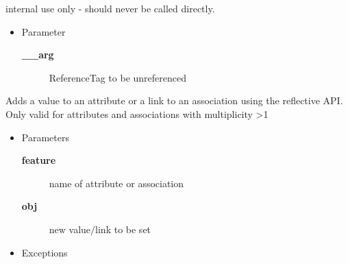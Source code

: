 \begin{desc}internal use only - should never be called directly.
\begin{itemize}
\item{Parameter
  \begin{description}
   \item[{\bf \_\_arg}]{ReferenceTag to be unreferenced}
  \end{description}}
\end{itemize}
\end{desc}

\begin{desc}Adds a value to an attribute or a link to an association using the
 reflective API. Only valid for attributes and associations with
 multiplicity \textgreater  1
\begin{itemize}
\item{Parameters
  \begin{description}
   \item[{\bf feature}]{name of attribute or association}
   \item[{\bf obj}]{new value$/$link to be set}
  \end{description}}
\end{itemize}
\begin{itemize}
\item{{Exceptions}
}
\end{itemize}
\end{desc}

